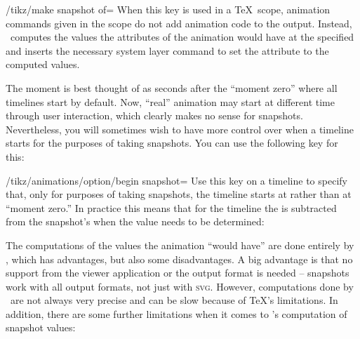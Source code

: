 \begin{key}{/tikz/make snapshot of=}
  When this key is used in a \TeX\ scope, animation commands given in
  the scope do not add animation code to the output. Instead,
  \pgfname\ computes the values the attributes of the animation would
  have at the specified  and inserts the necessary system
  layer command to set the attribute to the computed values.
  
\begin{codeexample}[]
\end{codeexample}

  The moment  is best thought of as  seconds
  after the ``moment zero'' where all timelines start by default. Now,
  ``real'' animation may start at different time through user
  interaction, which clearly makes no sense for
  snapshots. Nevertheless, you will sometimes wish to have more
  control over when a timeline starts for the purposes of taking
  snapshots. You can use the following key for this:

  \begin{key}{/tikz/animations/option/begin snapshot=}
    Use this key on a timeline to specify that, only for purposes of
    taking snapshots, the timeline starts at  rather
    than at ``moment zero.'' In practice this means that for the
    timeline the  is subtracted from the snapshot's
     when the value needs to be determined:
\begin{codeexample}[]
\end{codeexample}
  \end{key}

  The computations of the values the animation ``would have'' are done
  entirely by \tikzname, which has advantages, but also some
  disadvantages. A big advantage is that no support from the viewer
  application or the output format is needed -- snapshots work with
  all output formats, not just with \textsc{svg}. However,
  computations done by \tikzname\ are not always very precise and can
  be slow because of \TeX's limitations. In addition, there are some
  further limitations when it comes to \tikzname's computation of
  snapshot values:


\end{key}
